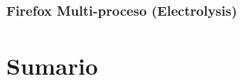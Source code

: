         
    \subsubsection{Firefox Multi-proceso (Electrolysis)} 

            

\section{Sumario}
\label{chap3:Summ}




%     
%     







